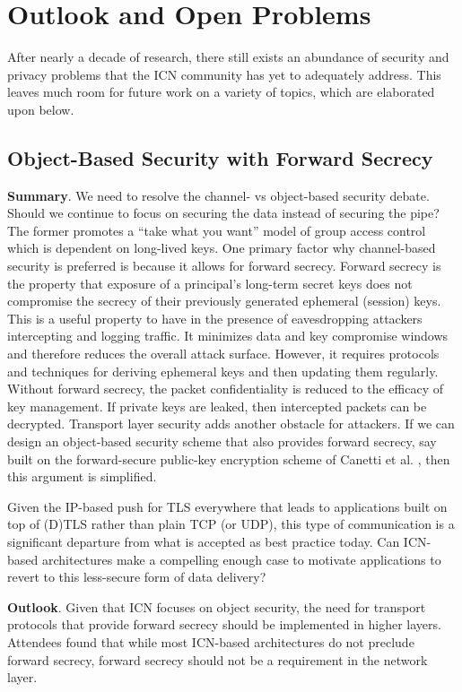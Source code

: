 \section{Outlook and Open Problems} \label{sec:outlook}
After nearly a decade of research, there still exists an abundance of security
and privacy problems that the ICN community has yet to adequately address.
This leaves much room for future work on a variety of topics, which are elaborated
upon below.

\subsection{Object-Based Security with Forward Secrecy}
{\bf Summary}. We need to resolve the channel- vs object-based security debate.
Should we continue to focus on securing the data instead of securing the pipe?
The former promotes a ``take what you want'' model of group access control which
is dependent on long-lived keys.
One primary factor why channel-based security is preferred is because it allows for forward
secrecy. Forward secrecy is the property that exposure of a principal's long-term secret keys
does not compromise the secrecy of their previously generated ephemeral (session)
keys. This is a useful property to have in the presence of eavesdropping attackers
intercepting and logging traffic. It minimizes data and key compromise windows and
therefore reduces the overall attack surface. However, it requires protocols and
techniques for deriving ephemeral keys and then updating them regularly.
Without forward secrecy, the packet confidentiality is reduced to the efficacy of key management.
If private keys are leaked, then intercepted packets can be decrypted.
Transport layer security adds another obstacle for attackers. If we can design an object-based security scheme that
also provides forward secrecy, say built on the forward-secure public-key
encryption scheme of Canetti et al. \cite{canetti2003forward}, then this argument is simplified.

Given the IP-based push for TLS everywhere that leads to applications built on top of (D)TLS
rather than plain TCP (or UDP), this type of communication is a significant departure from
what is accepted as best practice today. Can ICN-based architectures make a compelling
enough case to motivate applications to revert to this less-secure form of
data delivery?

{\bf Outlook}. Given that ICN focuses on object security, the need for transport
protocols that provide forward secrecy should be implemented in higher layers. Attendees
found that while most ICN-based architectures do not preclude forward secrecy, forward secrecy should
not be a requirement in the network layer.\\

